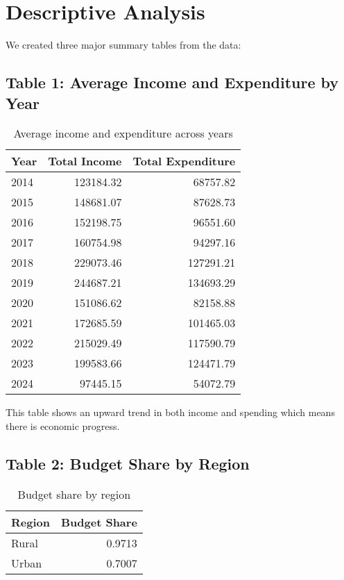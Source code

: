 \documentclass[12pt]{article}
\begin{document}
\section{Descriptive Analysis}
We created three major summary tables from the data:

\subsection*{Table 1: Average Income and Expenditure by Year}
\begin{table}[h!]
\centering
\caption{Average income and expenditure across years}
\label{tab:avg_income}
\begin{tabular}{lrr}
\toprule
\textbf{Year} & \textbf{Total Income} & \textbf{Total Expenditure} \\
\midrule
2014 & 123184.32 & 68757.82 \\
2015 & 148681.07 & 87628.73 \\
2016 & 152198.75 & 96551.60 \\
2017 & 160754.98 & 94297.16 \\
2018 & 229073.46 & 127291.21 \\
2019 & 244687.21 & 134693.29 \\
2020 & 151086.62 & 82158.88 \\
2021 & 172685.59 & 101465.03 \\
2022 & 215029.49 & 117590.79 \\
2023 & 199583.66 & 124471.79 \\
2024 & 97445.15  &  54072.79 \\
\bottomrule
\end{tabular}
\end{table}

This table shows an upward trend in both income and spending which means there is economic progress.

\subsection*{Table 2: Budget Share by Region}
\begin{table}[h!]
\centering
\caption{Budget share by region}
\label{tab:budget_share}
\begin{tabular}{lr}
\toprule
\textbf{Region} & \textbf{Budget Share} \\
\midrule
Rural & 0.9713 \\
Urban & 0.7007 \\
\bottomrule
\end{tabular}
\end{table}
\end{document}
